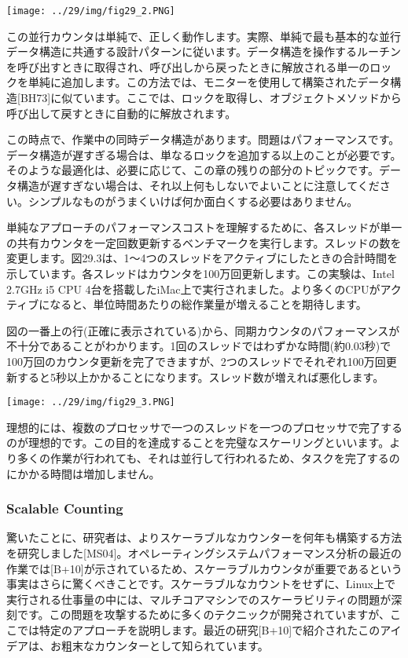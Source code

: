 \texttt{[image: ../29/img/fig29\_2.PNG]}

この並行カウンタは単純で、正しく動作します。実際、単純で最も基本的な並行データ構造に共通する設計パターンに従います。データ構造を操作するルーチンを呼び出すときに取得され、呼び出しから戻ったときに解放される単一のロックを単純に追加します。この方法では、モニターを使用して構築されたデータ構造{[}BH73{]}に似ています。ここでは、ロックを取得し、オブジェクトメソッドから呼び出して戻すときに自動的に解放されます。

この時点で、作業中の同時データ構造があります。問題はパフォーマンスです。データ構造が遅すぎる場合は、単なるロックを追加する以上のことが必要です。そのような最適化は、必要に応じて、この章の残りの部分のトピックです。データ構造が遅すぎない場合は、それ以上何もしないでよいことに注意してください。シンプルなものがうまくいけば何か面白くする必要はありません。

単純なアプローチのパフォーマンスコストを理解するために、各スレッドが単一の共有カウンタを一定回数更新するベンチマークを実行します。スレッドの数を変更します。図29.3は、1〜4つのスレッドをアクティブにしたときの合計時間を示しています。各スレッドはカウンタを100万回更新します。この実験は、Intel
2.7GHz i5 CPU
4台を搭載したiMac上で実行されました。より多くのCPUがアクティブになると、単位時間あたりの総作業量が増えることを期待します。

図の一番上の行(正確に表示されている)から、同期カウンタのパフォーマンスが不十分であることがわかります。1回のスレッドではわずかな時間(約0.03秒)で100万回のカウンタ更新を完了できますが、2つのスレッドでそれぞれ100万回更新すると5秒以上かかることになります。スレッド数が増えれば悪化します。

\texttt{[image: ../29/img/fig29\_3.PNG]}

理想的には、複数のプロセッサで一つのスレッドを一つのプロセッサで完了するのが理想的です。この目的を達成することを完璧なスケーリングといいます。より多くの作業が行われても、それは並行して行われるため、タスクを完了するのにかかる時間は増加しません。

\hypertarget{scalable-counting}{%
\subsubsection*{Scalable Counting}\label{scalable-counting}}

驚いたことに、研究者は、よりスケーラブルなカウンターを何年も構築する方法を研究しました{[}MS04{]}。オペレーティングシステムパフォーマンス分析の最近の作業では{[}B+10{]}が示されているため、スケーラブルカウンタが重要であるという事実はさらに驚くべきことです。スケーラブルなカウントをせずに、Linux上で実行される仕事量の中には、マルチコアマシンでのスケーラビリティの問題が深刻です。この問題を攻撃するために多くのテクニックが開発されていますが、ここでは特定のアプローチを説明します。最近の研究{[}B+10{]}で紹介されたこのアイデアは、お粗末なカウンターとして知られています。

